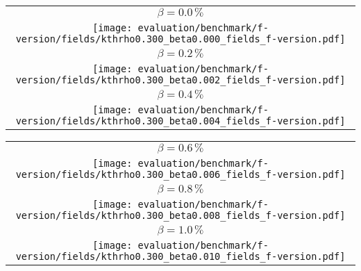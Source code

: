\begin{center}
    \begin{tabular}{c}
        $ \beta = 0.0\,\%$ \\
        \texttt{[image: evaluation/benchmark/f-version/fields/kthrho0.300\_beta0.000\_fields\_f-version.pdf]} \\
        $ \beta = 0.2\,\%$ \\
        \texttt{[image: evaluation/benchmark/f-version/fields/kthrho0.300\_beta0.002\_fields\_f-version.pdf]} \\
        $ \beta = 0.4\,\%$ \\
        \texttt{[image: evaluation/benchmark/f-version/fields/kthrho0.300\_beta0.004\_fields\_f-version.pdf]} \\
    \end{tabular}
\end{center}

\begin{center}
    \begin{tabular}{c}
        $ \beta = 0.6\,\%$ \\
        \texttt{[image: evaluation/benchmark/f-version/fields/kthrho0.300\_beta0.006\_fields\_f-version.pdf]} \\
        $ \beta = 0.8\,\%$ \\
        \texttt{[image: evaluation/benchmark/f-version/fields/kthrho0.300\_beta0.008\_fields\_f-version.pdf]} \\
        $ \beta = 1.0\,\%$ \\
        \texttt{[image: evaluation/benchmark/f-version/fields/kthrho0.300\_beta0.010\_fields\_f-version.pdf]} \\
    \end{tabular}
\end{center}

